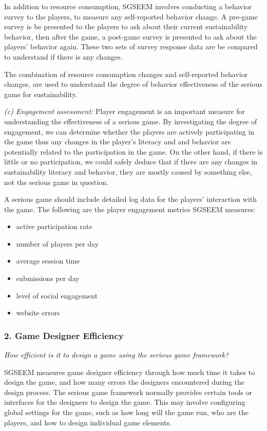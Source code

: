 \documentclass{sigchi}
\begin{document}
In addition to resource consumption, SGSEEM involves conducting a
behavior survey to the players, to measure any self-reported behavior
change. A pre-game survey is be presented to the players to ask about
their current sustainability behavior, then after the game, a post-game
survey is presented to ask about the players' behavior again. These two
sets of survey response data are be compared to understand if there is
any changes.

The combination of resource consumption changes and self-reported
behavior changes, are used to understand the degree of behavior
effectiveness of the serious game for sustainability.

\emph {(c) Engagement assessment:} Player engagement is an important
measure for understanding the effectiveness of a serious game. By
investigating the degree of engagement, we can determine whether the
players are actively participating in the game thus any changes in the
player's literacy and and behavior are potentially related to the
participation in the game. On the other hand, if there is little or no
participation, we could safely deduce that if there are any changes in
sustainability literacy and behavior, they are mostly caused by
something else, not the serious game in question.

A serious game should include detailed log data for the players'
interaction with the game. The following are the player engagement
metrics SGSEEM measures:

\begin{itemize}
\item active participation rate
\item number of players per day
\item average session time
\item submissions per day
\item level of social engagement
\item website errors
\end{itemize}

\subsubsection{2. Game Designer Efficiency}

\emph{How efficient is it to design a game using the serious game
  framework?}

SGSEEM measures game designer efficiency through how much time it takes
to design the game, and how many errors the designers encountered during
the design process.  The serious game framework normally provides
certain tools or interfaces for the designers to design the game. This
may involve configuring global settings for the game, such as how long
will the game run, who are the players, and how to design individual
game elements.
\end{document}
